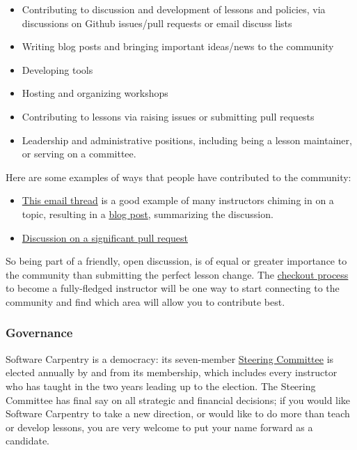 \begin{itemize}
\item Contributing to discussion and development of lessons and policies, via
discussions on Github issues/pull requests or email discuss lists
\item Writing blog posts and bringing important ideas/news to the community
\item Developing tools
\item Hosting and organizing workshops
\item Contributing to lessons via raising issues or submitting pull requests
\item Leadership and administrative positions, including being a lesson maintainer,
 or serving on a committee.
\end{itemize}

Here are some examples of ways that people have contributed to the community:

\begin{itemize}
\item \href{http://lists.software-carpentry.org/pipermail/discuss/2015-October/003396.html}{This email thread}
is a good example of many instructors chiming in on a topic, resulting in a
\href{http://software-carpentry.org/blog/2015/10/pulling-along-those-behind.html}{blog post},
summarizing the discussion.
\item \href{https://github.com/swcarpentry/r-novice-gapminder/pull/89}{Discussion on a significant pull request}
\end{itemize}

So being part of a friendly, open discussion, is of equal or greater importance
to the community than submitting the perfect lesson change.  The
\href{\{\{ page.root \}\}/checkout/}{checkout process} to become a fully-fledged instructor will be
one way to start connecting to the community and find which area will allow you
to contribute best.

\subsubsection*{Governance}

Software Carpentry is a democracy:
its seven-member \href{\{\{ site.swc\_site \}\}/scf/}{Steering Committee} is elected annually
by and from its membership,
which includes every instructor who has taught in the two years leading up to the election.
The Steering Committee has final say on all strategic and financial decisions;
if you would like Software Carpentry to take a new direction,
or would like to do more than teach or develop lessons,
you are very welcome to put your name forward as a candidate.

